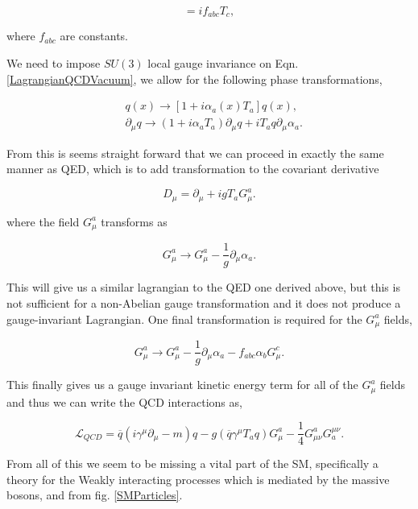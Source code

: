 \begin{equation}
[T_a, T_b]=if_{abc}T_c,
\end{equation}

where $f_{abc}$ are constants. 

We need to impose $SU(3)$ local gauge invariance on Eqn. \ref{LagrangianQCDVacuum}, we allow for the following phase transformations,

\begin{equation}
\begin{split}
& q(x)\rightarrow[1+i\alpha_a(x)T_a]q(x), \\
& \partial_\mu q\rightarrow(1+i\alpha_aT_a)\partial_\mu q+iT_aq\partial_\mu\alpha_a.
\end{split}
\end{equation}

From this is seems straight forward that we can proceed in exactly the same manner as QED, which is to add transformation to the covariant derivative

\begin{equation}
D_\mu=\partial_\mu+igT_aG_\mu^a.
\end{equation}

where the field $G_\mu^a$ transforms as

\begin{equation}
G_\mu^a\rightarrow G_\mu^a-\frac{1}{g}\partial_\mu\alpha_a.
\end{equation}

This will give us a similar lagrangian to the QED one derived above, but this is not sufficient for a non-Abelian gauge transformation and it does not produce a gauge-invariant Lagrangian. One final transformation is required for the $G_\mu^a$ fields, 

\begin{equation}\label{QCDGaugeTransform}
G_\mu^a\rightarrow G_\mu^a-\frac{1}{g}\partial_\mu\alpha_a-f_{abc}\alpha_b G_\mu^c.
\end{equation}

This finally gives us a gauge invariant kinetic energy term for all of the $G_\mu^a$ fields and thus we can write the QCD interactions as,

\begin{equation}\label{LagrangianQCD}
\mathcal{L}_{QCD}=\overline{q}(i\gamma^\mu\partial_\mu-m)q-g(\overline{q}\gamma^\mu T_a q)G^a_\mu-\frac{1}{4}G^a_{\mu\nu}G_a^{\mu\nu}.
\end{equation}

From all of this we seem to be missing a vital part of the SM, specifically a theory for the Weakly interacting processes which is mediated by the massive bosons, \W and \Z from fig. \ref{SMParticles}. 

